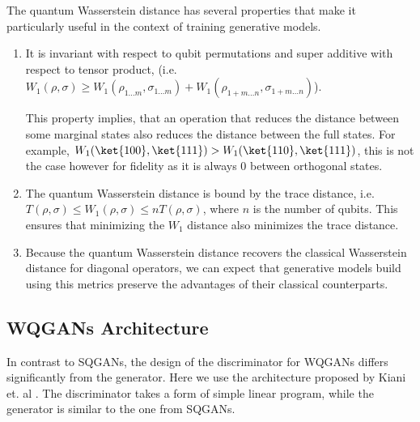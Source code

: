 The quantum Wasserstein distance has several properties that make it
particularly useful in the context of training generative models.
\begin{enumerate}
\item It is invariant with respect to qubit permutations and super additive with
  respect to tensor product, (i.e. $W_1(\rho, \sigma) \geq W_1(\rho_{1 \ldots m},
  \sigma_{1 \ldots m}) + W_1(\rho_{1+m \ldots n},
  \sigma_{1+m \ldots n})$). 

  This property implies, that an operation that reduces the distance between some
  marginal states also reduces the distance between the full states. For example,
  $W_1(\ket{100}, \ket{111}) > W_1(\ket{110}, \ket{111})$, this is not the case
  however for fidelity as it is always $0$
  between orthogonal states. 
\item The quantum Wasserstein distance is bound by the trace distance, i.e.
  $T(\rho, \sigma) \leq W_1(\rho, \sigma) \leq nT(\rho, \sigma)$, where $n$ is
  the number of qubits. This ensures that minimizing the $W_1$ distance also
  minimizes the trace distance.
\item Because the quantum Wasserstein distance recovers the classical Wasserstein
  distance for diagonal operators, we can expect that generative models build
  using this metrics preserve the advantages of their classical counterparts.
\end{enumerate}

\subsection{WQGANs Architecture}
In contrast to SQGANs, the design of the discriminator for WQGANs
differs significantly from the generator. Here we use the architecture proposed by Kiani et. al
\cite{kiani2021quantum}. The discriminator takes a form of simple linear
program, while the generator is similar to the one from SQGANs.

